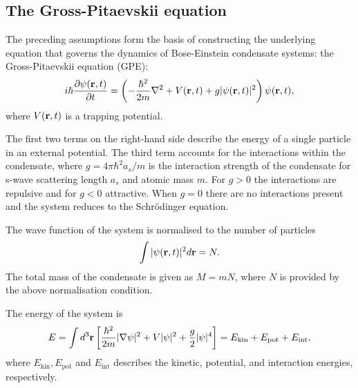 \subsection{The Gross-Pitaevskii equation}
The preceding assumptions form the basis of constructing the underlying equation
that governs the dynamics of Bose-Einstein condensate systems: the
Gross-Pitaevskii equation (GPE):
\begin{equation}\label{eq: scalar-GPE}
    i\hbar \pdv{\psi(\vb{r}, t)}{t} = \left(-\frac{\hbar^2}{2m}\nabla^2
    + V(\vb{r}, t) +g|\psi(\vb{r}, t)|^2\right)\psi(\vb{r}, t),
\end{equation}
where \(V(\vb{r}, t)\) is a trapping potential.

The first two terms on the right-hand side describe the energy of a single
particle in an external potential.
The third term accounts for the interactions within the condensate, where
\(g=4\pi \hbar^2a_s/m\) is the interaction strength of the condensate for
s-wave scattering length \(a_s\) and atomic mass \(m\).
For \(g>0\) the interactions are repulsive and for \(g < 0\) attractive.
When \(g=0\) there are no interactions present and the system reduces to the
Schr\"{o}dinger equation.

The wave function of the system is normalised to the number of particles
\begin{equation}
    \int |\psi(\vb{r}, t)|^2 d\vb{r} = N.
\end{equation}
The total mass of the condensate is given as \(M=mN\), where \(N\) is provided
by the above normalisation condition.

The energy of the system is
\begin{equation}
    E = \int d^3\vb{r} \left[\frac{\hbar^2}{2m}|\nabla\psi|^2
        + V|\psi|^2 + \frac{g}{2}|\psi|^4\right]
    = E_\mathrm{kin} + E_\mathrm{pot} + E_\mathrm{int},
\end{equation}
where \(E_\mathrm{kin}, E_\mathrm{pot}\) and \(E_\mathrm{int}\) describes the
kinetic, potential, and interaction energies, respectively.

